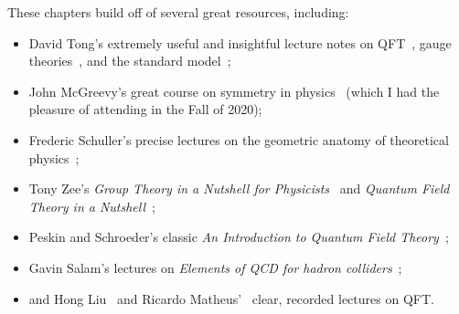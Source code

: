 These chapters build off of several great resources, including:
\begin{itemize}
	\item David Tong's extremely useful and insightful lecture notes on QFT~\cite{TongQFT}, gauge theories~\cite{TongGT}, and the standard model~\cite{TongSM};
	\item John McGreevy's great course on symmetry in physics~\cite{McGreevyGT} (which I had the pleasure of attending in the Fall of 2020);
	\item Frederic Schuller's precise lectures on the geometric anatomy of theoretical physics~\cite{SchullerGATP};
	\item Tony Zee's \textit{Group Theory in a Nutshell for Physicists}~\cite{Zee:2016fuk} and \textit{Quantum Field Theory in a Nutshell}~\cite{Zee:2003mt};
	\item Peskin and Schroeder's classic \textit{An Introduction to Quantum Field Theory}~\cite{Peskin:1995ev};
	\item Gavin Salam's lectures on \textit{Elements of QCD for hadron colliders}~\cite{Salam:2010zt};
	\item and Hong Liu~\cite{LiuRQFT} and Ricardo Matheus'~\cite{MatheusQFT} clear, recorded lectures on QFT.
\end{itemize}
